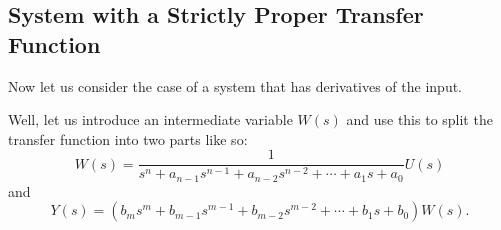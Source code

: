 \subsection*{System with a Strictly Proper Transfer Function}
Now let us consider the case of a system that has derivatives of
the input.
\ifslidesonly
\begin{slide}

\end{slide}
\fi


Well, let us introduce an intermediate variable $W(s)$ and use this to
split the transfer function into two parts like so:
\begin{equation}\label{eq:l5e1}
W(s) = \frac{1}{s^n +
a_{n-1}s^{n-1}+a_{n-2}s^{n-2}+\cdots+a_1s+a_0}U(s)
\end{equation}
and
\begin{equation}\label{eq:l5e2}
Y(s) = \left(b_ms^m +
b_{m-1}s^{m-1}+b_{m-2}s^{m-2}+\cdots+b_1s+b_0\right)W(s).\end{equation}

